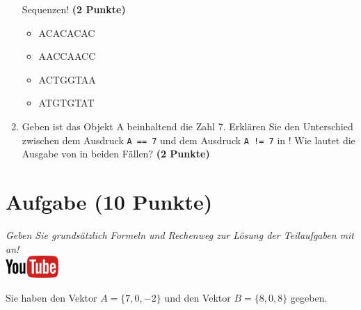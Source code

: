 \documentclass[a4paper, 9pt]{scrartcl}\usepackage[]{graphicx}\usepackage[]{xcolor}
\begin{document}
\begin{enumerate}
  Sequenzen! \textbf{(2 Punkte)}
  \begin{itemize}
  \item ACACACAC
  \item AACCAACC
  \item ACTGGTAA
  \item ATGTGTAT
  \end{itemize}
\item Geben ist das \Rlogo Objekt A beinhaltend die Zahl
  7. Erkl{\"a}ren Sie den Unterschied zwischen dem Ausdruck \texttt{A == 7}
  und dem Ausdruck \texttt{A != 7} in \Rlogo! Wie lautet die Ausgabe von \Rlogo
  in beiden F{\"a}llen? \textbf{(2 Punkte)}
\end{enumerate}


  
\clearpage

\section{Aufgabe \hfill (10 Punkte)}

\textit{Geben Sie grunds{\"a}tzlich Formeln und Rechenweg zur L{\"o}sung der
  Teilaufgaben mit an!} \\[1Ex]

\hfill\href{https://youtu.be/x_MwWJoEsME}{\includegraphics[width =
  2cm]{img/youtube}} %
\hspace{2Ex}



Sie haben den Vektor $A = \{7, 0, -2\}$ und den Vektor $B = \{8, 0, 8\}$ gegeben.
\end{document}
